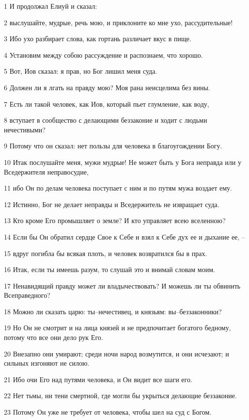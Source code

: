 \par 1 И продолжал Елиуй и сказал:
\par 2 выслушайте, мудрые, речь мою, и приклоните ко мне ухо, рассудительные!
\par 3 Ибо ухо разбирает слова, как гортань различает вкус в пище.
\par 4 Установим между собою рассуждение и распознаем, что хорошо.
\par 5 Вот, Иов сказал: я прав, но Бог лишил меня суда.
\par 6 Должен ли я лгать на правду мою? Моя рана неисцелима без вины.
\par 7 Есть ли такой человек, как Иов, который пьет глумление, как воду,
\par 8 вступает в сообщество с делающими беззаконие и ходит с людьми нечестивыми?
\par 9 Потому что он сказал: нет пользы для человека в благоугождении Богу.
\par 10 Итак послушайте меня, мужи мудрые! Не может быть у Бога неправда или у Вседержителя неправосудие,
\par 11 ибо Он по делам человека поступает с ним и по путям мужа воздает ему.
\par 12 Истинно, Бог не делает неправды и Вседержитель не извращает суда.
\par 13 Кто кроме Его промышляет о земле? И кто управляет всею вселенною?
\par 14 Если бы Он обратил сердце Свое к Себе и взял к Себе дух ее и дыхание ее, --
\par 15 вдруг погибла бы всякая плоть, и человек возвратился бы в прах.
\par 16 Итак, если ты имеешь разум, то слушай это и внимай словам моим.
\par 17 Ненавидящий правду может ли владычествовать? И можешь ли ты обвинить Всеправедного?
\par 18 Можно ли сказать царю: ты--нечестивец, и князьям: вы--беззаконники?
\par 19 Но Он не смотрит и на лица князей и не предпочитает богатого бедному, потому что все они дело рук Его.
\par 20 Внезапно они умирают; среди ночи народ возмутится, и они исчезают; и сильных изгоняют не силою.
\par 21 Ибо очи Его над путями человека, и Он видит все шаги его.
\par 22 Нет тьмы, ни тени смертной, где могли бы укрыться делающие беззаконие.
\par 23 Потому Он уже не требует от человека, чтобы шел на суд с Богом.
